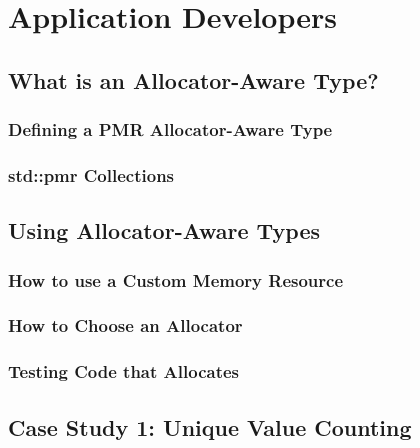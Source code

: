 \chapter{Application Developers}

\section{What is an Allocator-Aware Type?}
\subsection{Defining a PMR Allocator-Aware Type}
\subsection{std::pmr Collections}

\section{Using Allocator-Aware Types}
\subsection{How to use a Custom Memory Resource}
\subsection{How to Choose an Allocator}
\subsection{Testing Code that Allocates}

\section{Case Study 1: Unique Value Counting}

